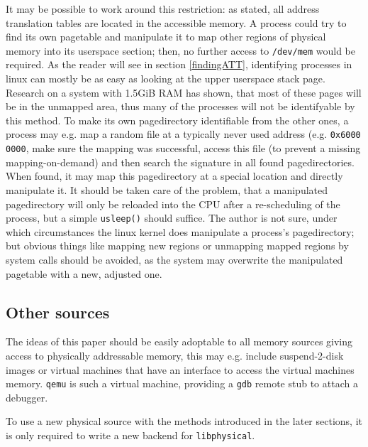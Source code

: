 It may be possible to work around this restriction: as stated, all address
translation tables are located in the accessible memory. A process could try to
find its own pagetable and manipulate it to map other regions of physical memory
into its userspace section; then, no further access to \texttt{/dev/mem} would
be required. As the reader will see in section \ref{findingATT}, identifying
processes in linux can mostly be as easy as looking at the upper userspace stack
page.  Research on a system with 1.5GiB RAM has shown, that most of these pages
will be in the unmapped area, thus many of the processes will not be
identifyable by this method. To make its own pagedirectory identifiable from the
other ones, a process may e.g. map a random file at a typically never used
address (e.g.  \texttt{0x6000 0000}, make sure the mapping was successful,
access this file (to prevent a missing mapping-on-demand) and then search the
signature in all found pagedirectories. When found, it may map this
pagedirectory at a special location and directly manipulate it. It should be
taken care of the problem, that a manipulated pagedirectory will only be
reloaded into the CPU after a re-scheduling of the process, but a simple
\texttt{usleep()} should suffice. The author is not sure, under which
circumstances the linux kernel does manipulate a process's pagedirectory; but
obvious things like mapping new regions or unmapping mapped regions by system
calls should be avoided, as the system may overwrite the manipulated pagetable
with a new, adjusted one.



\subsection{Other sources}

The ideas of this paper should be easily adoptable to all memory sources giving
access to physically addressable memory, this may e.g. include suspend-2-disk
images or virtual machines that have an interface to access the virtual machines
memory.  \texttt{qemu} is such a virtual machine, providing a \texttt{gdb}
remote stub to attach a debugger.

To use a new physical source with the methods introduced in the later sections,
it is only required to write a new backend for \texttt{libphysical}.

